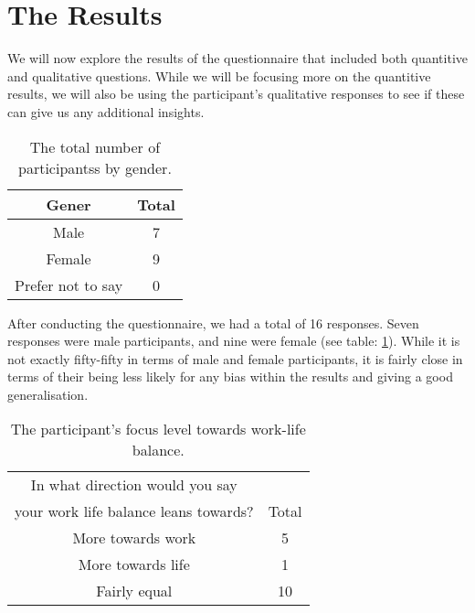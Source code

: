 \documentclass{sigchi}
\begin{document}
\section{The Results}
	

	We will now explore the results of the questionnaire that included both quantitive and qualitative questions. While we will be focusing more on the quantitive results, we will also be using the participant's qualitative responses to see if these can give us any additional insights.

	\begin{table}[ht]
		\centering
		\small
		\begin{tabular}[t]{|c| c |}
			\hline
			Gener & Total  \\ 
			\hline
			Male & 7 \\ 
			\hline
			Female & 9  \\ 
			\hline
			Prefer not to say &  0\\
			\hline
		\end{tabular}
		\caption{The total number of participantss by gender.}
		\label{tab:gender}
	\end{table}%


	After conducting the questionnaire, we had a total of 16 responses. Seven responses were male participants, and nine were female (see table: \ref{tab:gender}). While it is not exactly fifty-fifty in terms of male and female participants, it is fairly close in terms of their being less likely for any bias within the results and giving a good generalisation. 
	
	\begin{table}[ht]
		\centering
		\small
		\begin{tabular}[t]{ |c| c | }
			\hline
			In what direction would you say & \\
			your work life balance leans towards? & Total  \\ 
			\hline
			More towards work & 5 \\ 
			\hline
			More towards life & 1  \\ 
			\hline
			Fairly equal &  10 \\
			\hline
		\end{tabular}
		\caption{The participant's focus level towards work-life balance.}
		\label{tab:work_life_swing}
	\end{table}%
\end{document}

